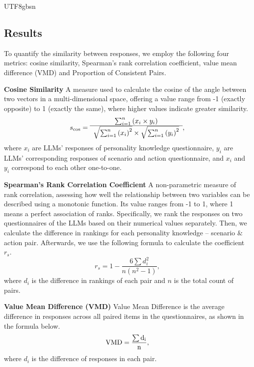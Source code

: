 \documentclass{article}
\theoremstyle{plain}
\theoremstyle{definition}
\theoremstyle{remark}
\begin{document}
\begin{CJK*}{UTF8}{gbsn}
\subsection{Results}\label{results}
To quantify the similarity between responses, we employ the following four metrics: cosine similarity, Spearman's rank correlation coefficient, value mean difference (VMD) and Proportion of Consistent Pairs.

\textbf{Cosine Similarity} \quad A measure used to calculate the cosine of the angle between two vectors in a multi-dimensional space, offering a value range from -1 (exactly opposite) to 1 (exactly the same), where higher values indicate greater similarity.
\begin{equation}
    s_{\rm{cos}} = 
\begin{array}{cl}
\sum_{i=1}^n\left(x_i\times y_i\right)\\
\hline
\sqrt{\sum_{i=1}^n\left(x_i\right)^2} \times \sqrt{\sum_{i=1}^n\left(y_i\right)^2}
\end{array} ,
\end{equation}%
where $x_i$ are LLMs' responses of personality knowledge questionnaire, $y_i$ are LLMs' corresponding responses of scenario and action questionnaire, and $x_i$ and $y_i$ correspond to each other one-to-one.

\textbf{Spearman's Rank Correlation Coefficient} \quad A non-parametric measure of rank correlation, assessing how well the relationship between two variables can be described using a monotonic function. Its value ranges from -1 to 1, where 1 means a perfect association of ranks. Specifically, we rank the responses on two questionnaires of the LLMs based on their numerical values separately. Then, we calculate the difference in rankings for each personality knowledge – scenario $\&$ action pair. Afterwards, we use the following formula to calculate the coefficient $r_s$. 
\begin{equation}
    r_s=1-\frac{6\sum d_i^2}{n(n^2-1)},
\end{equation}
where $d_i$ is the difference in rankings of each pair and $n$ is the total count of pairs.

\textbf{Value Mean Difference (VMD)} \quad Value Mean Difference is the average difference in responses across all paired items in the questionnaires, as shown in the formula below.
\begin{equation}
    \rm{VMD} = \frac{\sum d_i}{n},
\end{equation}
where $d_i$ is the difference of responses in each pair.


\end{CJK*}
\end{document}
